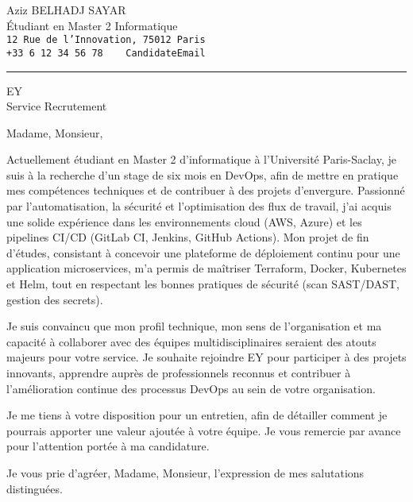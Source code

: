 \documentclass[11pt,a4paper]{letter}
\newcommand{\CandidateName}{Aziz BELHADJ SAYAR}
\newcommand{\CandidateTitle}{Étudiant en Master 2 Informatique}
\newcommand{\CandidateAddress}{12 Rue de l’Innovation, 75012 Paris}
\newcommand{\CandidatePhone}{+33 6 12 34 56 78}
\newcommand{\CompanyName}{EY}
\newcommand{\RecruitmentUnit}{Service Recrutement}
\newcommand{\Header}{
  \begin{center}
    {\Large\textcolor{headercolor}{\CandidateName}}\\[0.2cm]
    {\small \CandidateTitle}\\[0.1cm]
    \texttt{\CandidateAddress}\\
    \texttt{\CandidatePhone\ \ \ \ CandidateEmail}\\[0.4cm]
    \rule{\linewidth}{0.4pt}
  \end{center}
}
\begin{document}
\Header

\begin{letter}{\CompanyName \\ \RecruitmentUnit}

\opening{Madame, Monsieur,}

Actuellement étudiant en Master 2 d’informatique à l’Université Paris-Saclay, je suis à la recherche d’un stage de six mois en DevOps, afin de mettre en pratique mes compétences techniques et de contribuer à des projets d’envergure.  
Passionné par l’automatisation, la sécurité et l’optimisation des flux de travail, j’ai acquis une solide expérience dans les environnements cloud (AWS, Azure) et les pipelines CI/CD (GitLab CI, Jenkins, GitHub Actions). Mon projet de fin d’études, consistant à concevoir une plateforme de déploiement continu pour une application microservices, m’a permis de maîtriser Terraform, Docker, Kubernetes et Helm, tout en respectant les bonnes pratiques de sécurité (scan SAST/DAST, gestion des secrets).

Je suis convaincu que mon profil technique, mon sens de l’organisation et ma capacité à collaborer avec des équipes multidisciplinaires seraient des atouts majeurs pour votre service.  
Je souhaite rejoindre EY pour participer à des projets innovants, apprendre auprès de professionnels reconnus et contribuer à l’amélioration continue des processus DevOps au sein de votre organisation.

Je me tiens à votre disposition pour un entretien, afin de détailler comment je pourrais apporter une valeur ajoutée à votre équipe.  
Je vous remercie par avance pour l’attention portée à ma candidature.

\closing{Je vous prie d’agréer, Madame, Monsieur, l’expression de mes salutations distinguées.}

\end{letter}
\end{document}
